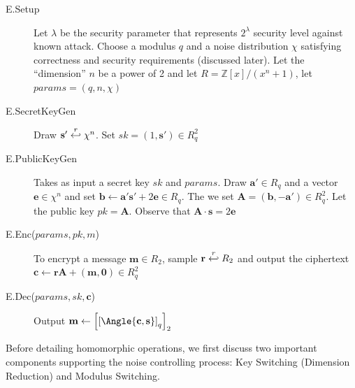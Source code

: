 \begin{description}
\item[E.Setup] Let $\lambda$ be the security parameter that represents
  $2^{\lambda}$ security level against known attack. Choose a modulus $q$ and a
  noise distribution $\chi$ satisfying correctness and security requirements
  (discussed later). Let the ``dimension'' $n$ be a power of 2 and let
  $R = \mathbb{Z}[x] / (x^{n} + 1)$, let $params = (q, n, \chi)$
\item[E.SecretKeyGen] Draw $\mathbf{s'} \stackrel{r}{\hookleftarrow} \chi^{n}$. Set $sk = (1,\mathbf{s'}) \in R_{q}^{2}$
\item[E.PublicKeyGen] Takes as input a secret key $sk$ and $params$. Draw
  $\mathbf{a'} \in R_{q}$ and a vector $\mathbf{e} \in \chi^{n}$ and set
  $\mathbf{b} \gets \mathbf{a's'} + 2\mathbf{e} \in R_{q}$. The we set
  $\mathbf{A} = (\mathbf{b}, -\mathbf{a'}) \in R_{q}^{2}$. Let the public key
  $pk = \mathbf{A}$. Observe that $\mathbf{A} \cdot \mathbf{s} = 2\mathbf{e}$
\item[E.Enc($params, pk, m$)] To encrypt a message $\mathbf{m} \in R_{2}$,
  sample $\mathbf{r} \stackrel{r}{\hookleftarrow} R_{2}$ and output the ciphertext
  $\mathbf{c} \gets \mathbf{r}\mathbf{A} + \mathbf{(m,0)} \in R_{q}^{2}$
\item[E.Dec($params,sk,\mathbf{c}$)] Output
  $\mathbf{m} \gets
  \left[\left[\Angle{\mathbf{c},\mathbf{s}}\right]_{q}\right]_{2}$
\end{description}

Before detailing homomorphic operations, we first discuss two important
components supporting the noise controlling process: Key Switching (Dimension
Reduction) and Modulus Switching.

